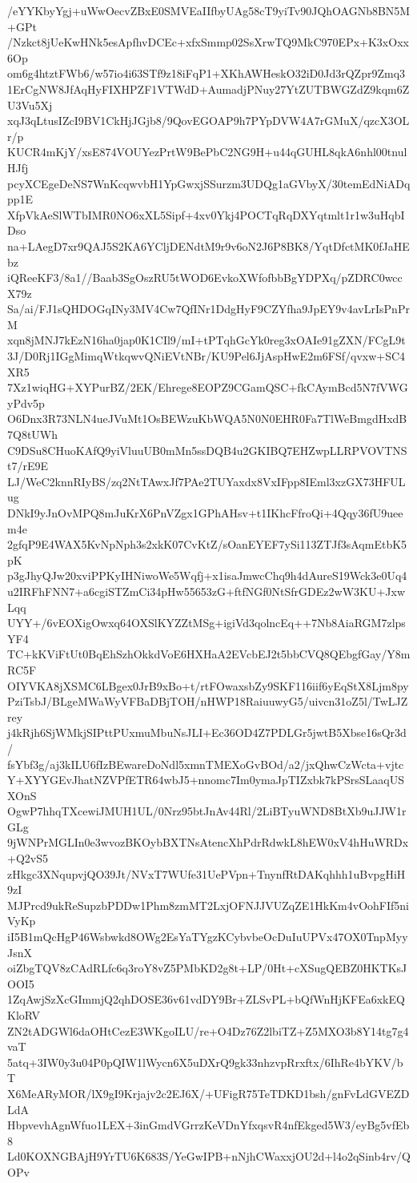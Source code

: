 /eYYKbyYgj+uWwOecvZBxE0SMVEaIIfbyUAg58cT9yiTv90JQhOAGNb8BN5M+GPt
/Nzkct8jUeKwHNk5esApfhvDCEc+xfxSmmp02SsXrwTQ9MkC970EPx+K3xOxx6Op
om6g4htztFWb6/w57io4i63STf9z18iFqP1+XKhAWHeskO32iD0Jd3rQZpr9Zmq3
1ErCgNW8JfAqHyFIXHPZF1VTWdD+AumadjPNuy27YtZUTBWGZdZ9kqm6ZU3Vu5Xj
xqJ3qLtusIZcI9BV1CkHjJGjb8/9QovEGOAP9h7PYpDVW4A7rGMuX/qzcX3OLr/p
KUCR4mKjY/xsE874VOUYezPrtW9BePbC2NG9H+u44qGUHL8qkA6nhl00tnulHJfj
pcyXCEgeDeNS7WnKcqwvbH1YpGwxjSSurzm3UDQg1aGVbyX/30temEdNiADqpp1E
XfpVkAeSlWTbIMR0NO6xXL5Sipf+4xv0Ykj4POCTqRqDXYqtmlt1r1w3uHqbIDso
na+LAegD7xr9QAJ5S2KA6YCljDENdtM9r9v6oN2J6P8BK8/YqtDfctMK0fJaHEbz
iQReeKF3/8a1//Baab3SgOszRU5tWOD6EvkoXWfofbbBgYDPXq/pZDRC0wccX79z
Sa/ai/FJ1sQHDOGqINy3MV4Cw7QfINr1DdgHyF9CZYfha9JpEY9v4avLrIsPnPrM
xqn8jMNJ7kEzN16ha0jap0K1CIl9/mI+tPTqhGcYk0reg3xOAIe91gZXN/FCgL9t
3J/D0Rj1IGgMimqWtkqwvQNiEVtNBr/KU9Pel6JjAspHwE2m6FSf/qvxw+SC4XR5
7Xz1wiqHG+XYPurBZ/2EK/Ehrege8EOPZ9CGamQSC+fkCAymBcd5N7fVWGyPdv5p
O6Dnx3R73NLN4ueJVuMt1OsBEWzuKbWQA5N0N0EHR0Fa7TlWeBmgdHxdB7Q8tUWh
C9DSu8CHuoKAfQ9yiVluuUB0mMn5ssDQB4u2GKIBQ7EHZwpLLRPVOVTNSt7/rE9E
LJ/WeC2knnRIyBS/zq2NtTAwxJf7PAe2TUYaxdx8VxIFpp8IEml3xzGX73HFULug
DNkI9yJnOvMPQ8mJuKrX6PnVZgx1GPhAHsv+t1IKhcFfroQi+4Qqy36fU9ueem4e
2gfqP9E4WAX5KvNpNph3s2xkK07CvKtZ/sOanEYEF7ySi113ZTJf3sAqmEtbK5pK
p3gJhyQJw20xviPPKyIHNiwoWe5Wqfj+x1isaJmwcChq9h4dAureS19Wck3e0Uq4
u2IRFhFNN7+a6cgiSTZmCi34pHw55653zG+ftfNGf0NtSfrGDEz2wW3KU+JxwLqq
UYY+/6vEOXigOwxq64OXSlKYZZtMSg+igiVd3qolncEq++7Nb8AiaRGM7zlpsYF4
TC+kKViFtUt0BqEhSzhOkkdVoE6HXHaA2EVcbEJ2t5bbCVQ8QEbgfGay/Y8mRC5F
OIYVKA8jXSMC6LBgex0JrB9xBo+t/rtFOwaxsbZy9SKF116iif6yEqStX8Ljm8py
PziTsbJ/BLgeMWaWyVFBaDBjTOH/nHWP18RaiuuwyG5/uivcn31oZ5l/TwLJZrey
j4kRjh6SjWMkjSIPttPUxmuMbuNsJLI+Ec36OD4Z7PDLGr5jwtB5Xbse16sQr3d/
fsYbf3g/aj3kILU6fIzBEwareDoNdl5xmnTMEXoGvBOd/a2/jxQhwCzWcta+vjtc
Y+XYYGEvJhatNZVPfETR64wbJ5+nnomc7Im0ymaJpTIZxbk7kPSrsSLaaqUSXOnS
OgwP7hhqTXcewiJMUH1UL/0Nrz95btJnAv44Rl/2LiBTyuWND8BtXb9uJJW1rGLg
9jWNPrMGLIn0e3wvozBKOybBXTNsAtencXhPdrRdwkL8hEW0xV4hHuWRDx+Q2vS5
zHkgc3XNqupvjQO39Jt/NVxT7WUfe31UePVpn+TnynfRtDAKqhhh1uBvpgHiH9zI
MJPrcd9ukReSupzbPDDw1Phm8zmMT2LxjOFNJJVUZqZE1HkKm4vOohFIf5niVyKp
iI5B1mQcHgP46Wsbwkd8OWg2EsYaTYgzKCybvbeOcDuIuUPVx47OX0TnpMyyJsnX
oiZbgTQV8zCAdRLfc6q3roY8vZ5PMbKD2g8t+LP/0Ht+cXSugQEBZ0HKTKsJOOI5
1ZqAwjSzXcGImmjQ2qhDOSE36v61vdDY9Br+ZLSvPL+bQfWnHjKFEa6xkEQKloRV
ZN2tADGWl6daOHtCezE3WKgoILU/re+O4Dz76Z2lbiTZ+Z5MXO3b8Y14tg7g4vaT
5atq+3IW0y3u04P0pQIW1lWycn6X5uDXrQ9gk33nhzvpRrxftx/6IhRe4bYKV/bT
X6MeARyMOR/lX9gI9Krjajv2c2EJ6X/+UFigR75TeTDKD1bsh/gnFvLdGVEZDLdA
HbpvevhAgnWfuo1LEX+3inGmdVGrrzKeVDnYfxqsvR4nfEkged5W3/eyBg5vfEb8
Ld0KOXNGBAjH9YrTU6K683S/YeGwIPB+nNjhCWaxxjOU2d+l4o2qSinb4rv/QOPv
